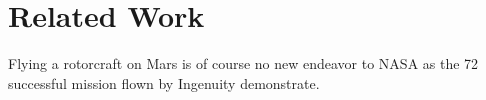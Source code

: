 \chapter{Related Work}
\label{sec:relwork}

Flying a rotorcraft on Mars is of course no new endeavor to NASA as the 72 successful mission flown by Ingenuity demonstrate. 
